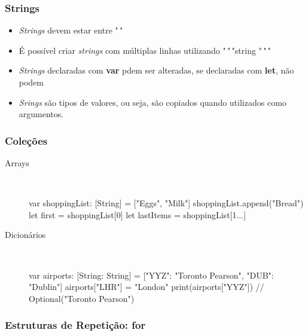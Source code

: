 \begin{frame}[fragile]
    \frametitle{Strings}

    \begin{itemize}
        \item \textit{Strings} devem estar entre "$\,\!$"
        \item É possível criar \textit{strings} com múltiplas linhas
        utilizando "$\,\!$"$\,\!$"string "$\,\!$"$\,\!$"
        \item \textit{Strings} declaradas com \textbf{var} pdem ser
        alteradas, se declaradas com \textbf{let}, não podem
        \item \textit{Srings} são tipos de valores, ou seja, são copiados
        quando utilizados como argumentos.
    \end{itemize}
\end{frame}

\begin{frame}[fragile]
    \frametitle{Coleções}

    \begin{description}
        \item[Arrays] \hfill \\
        \begin{swift}
    var shoppingList: [String] = ["Eggs", "Milk"]
    shoppingList.append("Bread")
    let first = shoppingList[0]
    let lastItems = shoppingList[1...]
        \end{swift}
        \item[Dicionários] \hfill \\
        \begin{swift}
    var airports: [String: String] =
        ["YYZ": "Toronto Pearson", "DUB": "Dublin"]
    airports["LHR"] = "London"
    print(airports["YYZ"])  // Optional("Toronto Pearson")
        \end{swift}
    \end{description}
\end{frame}

\begin{frame}[fragile]
    \frametitle{Estruturas de Repetição: \textbf{for}}

\end{frame}

